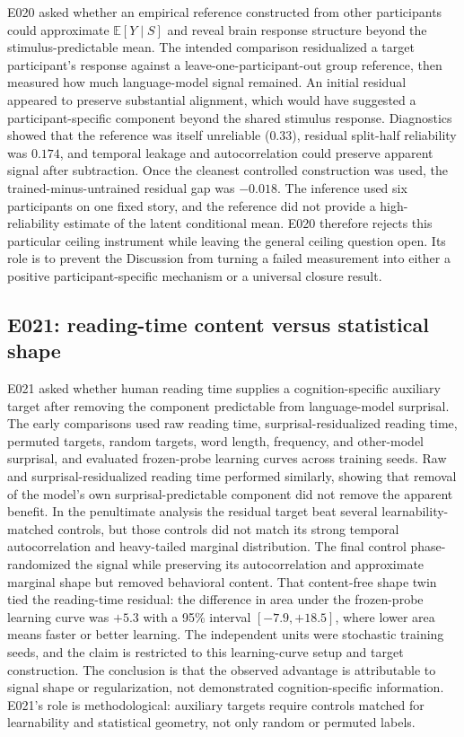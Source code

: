 E020 asked whether an empirical reference constructed from other participants could approximate $\mathbb{E}[Y\mid S]$ and reveal brain response structure beyond the stimulus-predictable mean.
The intended comparison residualized a target participant's response against a leave-one-participant-out group reference, then measured how much language-model signal remained.
An initial residual appeared to preserve substantial alignment, which would have suggested a participant-specific component beyond the shared stimulus response.
Diagnostics showed that the reference was itself unreliable ($0.33$), residual split-half reliability was $0.174$, and temporal leakage and autocorrelation could preserve apparent signal after subtraction. 
Once the cleanest controlled construction was used, the trained-minus-untrained residual gap was $-0.018$. 
The inference used six participants on one fixed story, and the reference did not provide a high-reliability estimate of the latent conditional mean.
E020 therefore rejects this particular ceiling instrument while leaving the general ceiling question open.
Its role is to prevent the Discussion from turning a failed measurement into either a positive participant-specific mechanism or a universal closure result.

\subsection{E021: reading-time content versus statistical shape}
\label{sec:e021}

E021 asked whether human reading time supplies a cognition-specific auxiliary target after removing the component predictable from language-model surprisal.
The early comparisons used raw reading time, surprisal-residualized reading time, permuted targets, random targets, word length, frequency, and other-model surprisal, and evaluated frozen-probe learning curves across training seeds.
Raw and surprisal-residualized reading time performed similarly, showing that removal of the model's own surprisal-predictable component did not remove the apparent benefit. 
In the penultimate analysis the residual target beat several learnability-matched controls, but those controls did not match its strong temporal autocorrelation and heavy-tailed marginal distribution.
The final control phase-randomized the signal while preserving its autocorrelation and approximate marginal shape but removed behavioral content.
That content-free shape twin tied the reading-time residual: the difference in area under the frozen-probe learning curve was $+5.3$ with a 95\% interval $[-7.9,+18.5]$, where lower area means faster or better learning. 
The independent units were stochastic training seeds, and the claim is restricted to this learning-curve setup and target construction.
The conclusion is that the observed advantage is attributable to signal shape or regularization, not demonstrated cognition-specific information.
E021's role is methodological: auxiliary targets require controls matched for learnability and statistical geometry, not only random or permuted labels.

